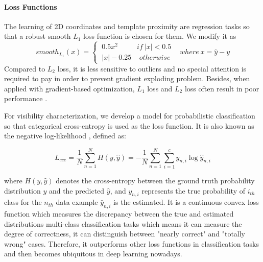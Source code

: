 \paragraph{Loss Functions}
The learning of 2D coordinates and template proximity are regression tasks so that a robust smooth $L_1$ loss function \cite{DBLP:journals/corr/Girshick15} is chosen for them. We modify it as
\begin{equation}
\label{eq10}
smooth_{L_1}(x) =
\begin{cases}
~0.5x^2 ~~~~~~~~~~~~if ~\left | x \right |< 0.5 & \\    
~\left | x \right | -0.25 ~~~~~otherwise   
\end{cases} 
where  ~ x=\widehat{y} - y
\end{equation}
Compared to $L_2$ loss, it is less sensitive to outliers and no special attention is required to pay in order to prevent gradient exploding problem\cite{DBLP:journals/corr/Girshick15}. Besides, when applied with gradient-based optimization, $L_1$ loss and $L_2$ loss often result in poor performance \cite{Goodfellow-et-al-2016}.

For visibility characterization, we develop a model for probabilistic classification so that categorical cross-entropy is used as the loss function. It is also known as the negative log-likelihood \cite{Goodfellow-et-al-2016}, defined as:

\begin{equation}
\label{eq11}
L_{cce} =\frac{1}{N} \sum_{n=1}^N H(y,\widehat{y}) = -\frac{1}{N}\sum_{n=1}^N \sum_{i=1}^c y_{n,i} \log \widehat{y}_{n,i}
\end{equation}

where $H(y, \widehat{y})$ denotes the cross-entropy between the ground truth probability distribution $y$ and the predicted $\widehat{y}$, and $y_{n,i} $ represents the true probability of $i_{th}$ class for the $n_{th}$ data example $\widehat{y}_{n,i}$ is the estimated. It is a continuous convex loss function which measures the discrepancy between the true and estimated distributions multi-class classification tasks \cite{DBLP:journals/corr/abs-1802-09941} which means it can measure the degree of correctness, \ie it can distinguish between "nearly correct" and "totally wrong" cases.  Therefore, it outperforms other loss functions in classification tasks and then becomes ubiquitous in deep learning nowadays.


